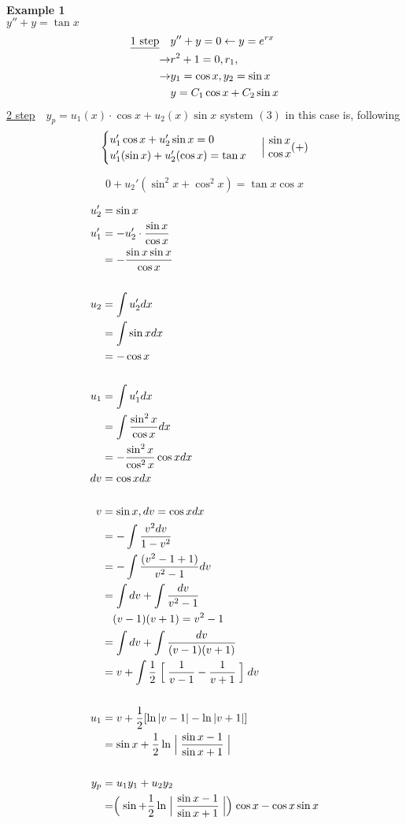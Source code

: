 \documentclass[10pt, letterpaper]{article}
\begin{document}
\\
\textbf{Example 1}\\
$y'' +y =\tan x$
\begin{align*}
\text{\underline{1 step}} ~~~ &y'' +y =0 \leftarrow y=e^{rx}\\
\rightarrow &r^2 +1 =0, r_1,\\
\rightarrow &y_1 =\cos x, y_2=\sin x\\
&y = C_1 \cos x +C_2 \sin x
\end{align*}
\underline{2 step} $~~~ y_p =u_1(x)\cdot \cos x +u_2(x) \sin x$ system $(3)$ in this case is, following
\begin{equation*}
\begin{cases}
	u_1'\cos x +u_2'\sin x =0\\
	u_1'(\sin x) +u_2'(\cos x) =\tan x
\end{cases}
\Bigm|
\begin{matrix}
\sin x\\
\cos x
\end{matrix}
(+)
\end{equation*}

\begin{equation*}
0 +u_2'(\sin^2x +\cos^2x) =\tan x \cos x
\end{equation*}

\begin{align*}
u_2' &= \sin x\\
u_1' &= -u_2' \cdot \frac{\sin x}{\cos x}\\
&= -\frac{\sin x \sin x}{\cos x}\\
\\
u_2 &= \int \limits u_2' dx\\
&= \int \limits \sin x dx\\
&= -\cos x\\
\\
u_1 &= \int \limits u_1' dx\\
&= \int \limits \frac{\sin^2x}{\cos x} dx\\
&= -\frac{\sin^2x}{\cos^2x} \cos x dx\\
dv &= \cos x dx\\
\\
v &= \sin x, dv = \cos xdx\\
&= -\int \limits \frac{v^2 dv}{1-v^2}\\
&= -\int \limits \frac{(v^2-1+1)}{v^2-1}dv\\
&= \int \limits dv +\int \limits \frac{dv}{v^2-1}\\
&~~~(v-1)(v+1) = v^2-1\\
&= \int \limits dv +\int \limits \frac{dv}{(v-1)(v+1)}\\
&= v +\int \limits \frac{1}{2} \Bigm[ \frac{1}{v-1} -\frac{1}{v+1} \Bigm]dv\\
\\
u_1 &= v +\frac{1}{2} [\ln|v-1| -\ln|v+1|]\\
&= \sin x +\frac{1}{2} \ln \Bigm|\frac{\sin x-1}{\sin x+1}\Bigm|\\
\\
y_p &= u_1y_1 +u_2y_2\\
&= \Bigm(\sin +\frac{1}{2}\ln \Bigm|\frac{\sin x-1}{\sin x+1}\Bigm| \Bigm) \cos x -\cos x \sin x
\end{align*}
\end{document}
